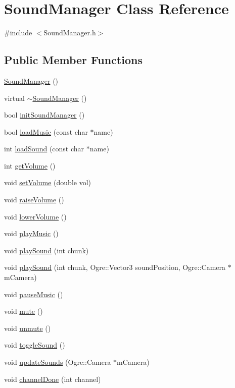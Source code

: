 \hypertarget{classSoundManager}{\section{Sound\-Manager Class Reference}
\label{classSoundManager}
}


{\ttfamily \#include $<$Sound\-Manager.\-h$>$}

\subsection*{Public Member Functions}
\begin{DoxyCompactItemize}
\item 
\hyperlink{classSoundManager_abcc1fbf3488be5788a42c9a4fe56df35}{Sound\-Manager} ()
\item 
virtual \hyperlink{classSoundManager_ad5dbf8eab22db48ff8f3db51b02f8938}{$\sim$\-Sound\-Manager} ()
\item 
bool \hyperlink{classSoundManager_ad1787c39537a0fc19215e7baacf04439}{init\-Sound\-Manager} ()
\item 
bool \hyperlink{classSoundManager_a57caed0509fdbe4710de7b5f7d4de201}{load\-Music} (const char $\ast$name)
\item 
int \hyperlink{classSoundManager_abaa5592584989a7c430b4c0bb74af36b}{load\-Sound} (const char $\ast$name)
\item 
int \hyperlink{classSoundManager_a013d883ce7fce00a50ffcc18b0336e16}{get\-Volume} ()
\item 
void \hyperlink{classSoundManager_a203b898b68db005daabc199622daf860}{set\-Volume} (double vol)
\item 
void \hyperlink{classSoundManager_af7708a26e281f838114f6b1e494dca7e}{raise\-Volume} ()
\item 
void \hyperlink{classSoundManager_a0c4febd5fbca1712fba50ed70c2e513f}{lower\-Volume} ()
\item 
void \hyperlink{classSoundManager_a6265e3f73b56fea0cab813cd0447d310}{play\-Music} ()
\item 
void \hyperlink{classSoundManager_a77322f5a208b15ba5495c57103b302e5}{play\-Sound} (int chunk)
\item 
void \hyperlink{classSoundManager_aba891af2b8adbc2d0d17471b92b52fb3}{play\-Sound} (int chunk, Ogre\-::\-Vector3 sound\-Position, Ogre\-::\-Camera $\ast$m\-Camera)
\item 
void \hyperlink{classSoundManager_a5071bf5e87394afdb1e4148227ffc3ea}{pause\-Music} ()
\item 
void \hyperlink{classSoundManager_ae8afa6738d1e3cb81ed90216574a08f4}{mute} ()
\item 
void \hyperlink{classSoundManager_adb6bd13299469546885f7469680a2699}{unmute} ()
\item 
void \hyperlink{classSoundManager_a316417bb0eb4ee5c84d7ed62cdd08705}{toggle\-Sound} ()
\item 
void \hyperlink{classSoundManager_a7f322297e6afd43b53fa082a9f027a2b}{update\-Sounds} (Ogre\-::\-Camera $\ast$m\-Camera)
\item 
void \hyperlink{classSoundManager_ae9598ffd36be9daa0b542e54ceca4fe4}{channel\-Done} (int channel)
\end{DoxyCompactItemize}
